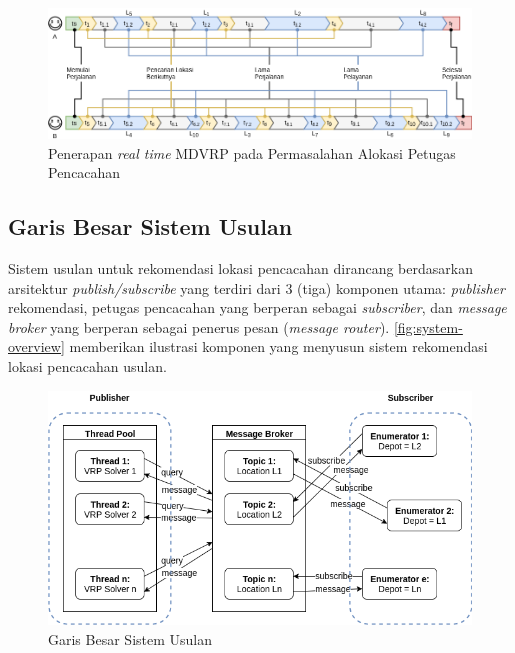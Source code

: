 \begin{figure}[!]
	\centering
	\includegraphics[width=\textwidth]{Resources/Images/illustration-timeline-realtime-mdvrp}
	\caption{Penerapan \textit{real time} MDVRP pada Permasalahan Alokasi Petugas Pencacahan}
	\label{fig:illustration-timeline-realtime-mdvrp}
\end{figure}

\subsection{Garis Besar Sistem Usulan}
Sistem usulan untuk rekomendasi lokasi pencacahan dirancang berdasarkan arsitektur \textit{publish/subscribe} yang terdiri dari 3 (tiga) komponen utama: \textit{publisher} rekomendasi, petugas pencacahan yang berperan sebagai \textit{subscriber}, dan \textit{message broker} yang berperan sebagai penerus pesan (\textit{message router}). \autoref{fig:system-overview} memberikan ilustrasi komponen yang menyusun sistem rekomendasi lokasi pencacahan usulan.


\begin{figure}[!]
	\centering
	\includegraphics[width=\textwidth]{Resources/Images/system-overview}
	\caption{Garis Besar Sistem Usulan}
	\label{fig:system-overview}
\end{figure}


